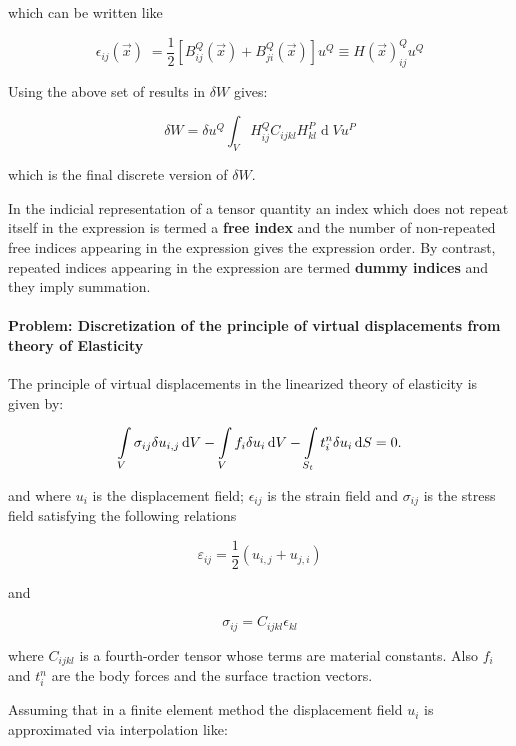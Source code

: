 which can be written like


\[ \epsilon_{ij}(\overrightarrow x)\;= \frac12 [B_{ij}^Q(\overrightarrow x) + B_{ji}^Q(\overrightarrow x) ]   u^Q \equiv H(\overrightarrow x)_{ij}^Q u^Q \]

Using the above set of results in $\delta W $ gives:

\begin{equation} 
\delta W=\delta u^Q\int_VH_{ij}^QC_{ijkl}H_{kl}^P\operatorname dVu^P
\label{discrete}
\end{equation}

which is the final discrete version of $\delta W $.

\begin{tcolorbox}
In the indicial representation of a tensor quantity an index which does not repeat itself in the expression is termed a {\bf free index} and the number of non-repeated free indices appearing in the expression gives the expression order. By contrast, repeated indices appearing in the expression are termed {\bf dummy indices} and they imply summation.
\end{tcolorbox}

\paragraph*{Problem: Discretization of the principle of virtual displacements from theory of Elasticity}

The principle of virtual displacements in the linearized theory of elasticity is given by:


\begin{equation} 
\int\limits_V \sigma_{ij} \delta u_{i,j} \dd{V} - \int\limits_V f_i \delta u_i \dd{V} - \int\limits_{S_t} t_i^n \delta u_i \dd{S} = 0.
\label{pvw_2}
\end{equation}

and where $u_i$ is the displacement field; $\epsilon_{ij}$ is the strain field and $\sigma_{ij}$ is the stress field satisfying the following relations

\[ \varepsilon_{ij}=\frac12(u_{i,j}+u_{j,i}) \]

and

\[\sigma_{ij} = C_{ijkl} \epsilon_{kl}\]

where $C_{ijkl}$ is a fourth-order tensor whose terms are material constants. Also $f_i$ and $t_i^n$ are the body forces and the surface traction vectors.

Assuming that in a finite element method the displacement field $u_i$ is approximated via interpolation like:

